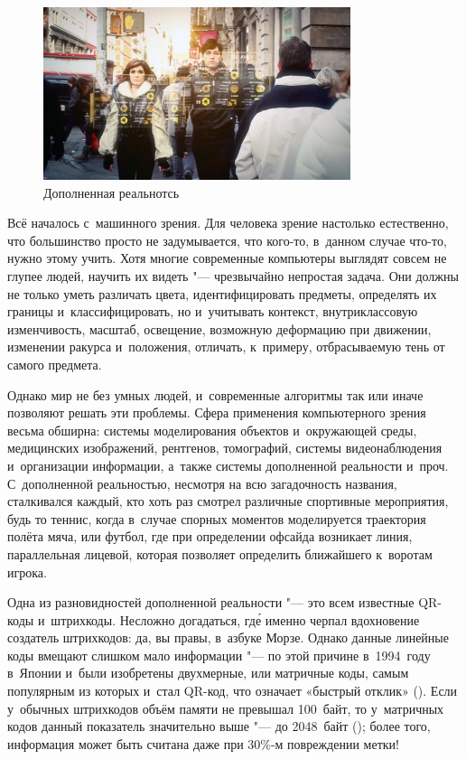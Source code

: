 \documentclass[final,pdftex]{../../template/epsilonj}
\begin{document}
\begin{figure}[htbp]
\centering 	\includegraphics[width=90mm]{1.jpg}
\caption{Дополненная реальнотсь} 
\end{figure}

Всё началось с~машинного зрения. Для человека зрение настолько естественно, что большинство просто не задумывается, что кого-то, в~данном случае что-то, нужно этому учить. Хотя многие современные компьютеры выглядят совсем не глупее людей, научить их видеть "--- чрезвычайно непростая задача. Они должны не только уметь различать цвета, идентифицировать предметы, определять их границы и~классифицировать, но и~учитывать контекст, внутриклассовую изменчивость, масштаб, освещение, возможную деформацию при движении, изменении ракурса и~положения, отличать, к~примеру, отбрасываемую тень от самого предмета.

Однако мир не без умных людей, и~современные алгоритмы так или иначе позволяют решать эти проблемы. Сфера применения компьютерного зрения весьма обширна: системы моделирования объектов и~окружающей среды, медицинских изображений, рентгенов, томографий, системы видеонаблюдения и~организации информации, а~также системы дополненной реальности и~проч. С~дополненной реальностью, несмотря на всю загадочность названия, сталкивался каждый, кто хоть раз смотрел различные спортивные мероприятия, будь то теннис, когда в~случае спорных моментов моделируется траектория полёта мяча, или футбол, где при определении офсайда возникает линия, параллельная лицевой, которая позволяет определить ближайшего к~воротам игрока.

Одна из разновидностей дополненной реальности "--- это всем известные QR-коды и~штрихкоды. Несложно догадаться, гд\'{е} именно черпал вдохновение создатель штрихкодов: да, вы правы, в~азбуке Морзе. Однако данные линейные коды вмещают слишком мало информации "--- по этой причине в~1994~году в~Японии и~были изобретены двухмерные, или матричные коды, самым популярным из которых и~стал QR-код, что означает «быстрый отклик» (). Если у~обычных штрихкодов объём памяти не превышал 100~байт, то у~матричных кодов данный показатель значительно выше "--- до 2048~байт (\cite{WikiDataMatrixRu}); более того, информация может быть считана даже при 30\%-м повреждении метки! 
\end{document}

